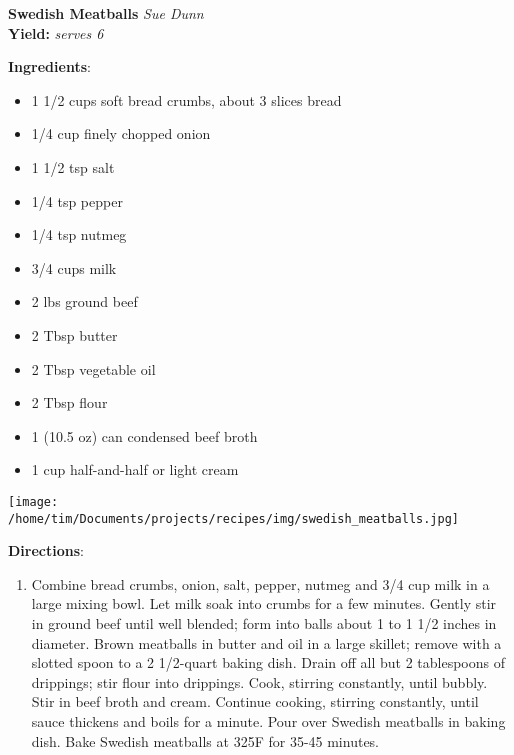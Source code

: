 \documentclass[11pt, twoside, openany]{book}
\begin{document}
\noindent\begin{minipage}[t]{\linewidth}%
{\Large\textbf{Swedish Meatballs}} \label{swedish-meatballs}\hfill\textit{Sue Dunn}\\
\textbf{Yield:} \textit{serves 6}\\
\noindent\begin{minipage}[t]{0.78\linewidth}%
\textbf{Ingredients}:\vspace{-3mm}
\begin{multicols}{2}
\begin{itemize}\setlength\itemsep{-1mm}
\item 1 1/2 cups soft bread crumbs, about 3 slices bread
\item 1/4 cup finely chopped onion
\item 1 1/2 tsp salt
\item 1/4 tsp pepper
\item 1/4 tsp nutmeg
\item 3/4 cups milk
\item 2 lbs ground beef
\item 2 Tbsp butter
\item 2 Tbsp vegetable oil
\item 2 Tbsp flour
\item 1 (10.5 oz) can condensed beef broth
\item 1 cup half-and-half or light cream
\end{itemize}
\end{multicols}
\end{minipage}
\noindent\begin{minipage}[t]{0.18\linewidth}
\centering \strut\vspace*{-\baselineskip}\newline
\texttt{[image: /home/tim/Documents/projects/recipes/img/swedish\_meatballs.jpg]}\\
\end{minipage}\vspace{3mm}
\textbf{Directions}:
\vspace{-3mm}\begin{enumerate}\setlength\itemsep{-1mm}
\item Combine bread crumbs, onion, salt, pepper, nutmeg and 3/4 cup milk in a large mixing bowl. Let milk soak into crumbs for a few minutes. Gently stir in ground beef until well blended; form into balls about 1 to 1 1/2 inches in diameter. Brown meatballs in butter and oil in a large skillet; remove with a slotted spoon to a 2 1/2-quart baking dish. Drain off all but 2 tablespoons of drippings; stir flour into drippings. Cook, stirring constantly, until bubbly. Stir in beef broth and cream. Continue cooking, stirring constantly, until sauce thickens and boils for a minute. Pour over Swedish meatballs in baking dish. Bake Swedish meatballs at 325F for 35-45 minutes.
\end{enumerate}
\end{minipage}\vspace{8mm}
\end{document}
